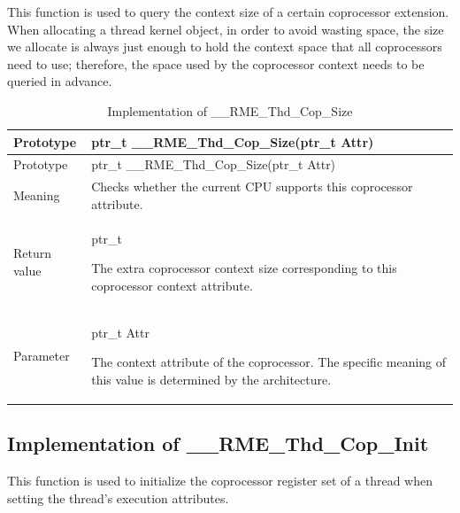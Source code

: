 This function is used to query the context size of a certain coprocessor extension. When allocating a thread kernel object, in order to avoid wasting space, the size we allocate is always just enough to hold the context space that all coprocessors need to use; therefore, the space used by the coprocessor context needs to be queried in advance.

\begin{xltabular}{\textwidth}{@{}>{\hsize\raggedright\arraybackslash}X>{\hsize\raggedright\arraybackslash}X@{}}
\caption{Implementation of \_\_RME\_Thd\_Cop\_Size}\label{tab:7-70-rme-thd-cop-size-implementation}\\
\toprule
Prototype & ptr\_t \_\_RME\_Thd\_Cop\_Size(ptr\_t Attr)\tabularnewline
\endfirsthead
\toprule
Prototype & ptr\_t \_\_RME\_Thd\_Cop\_Size(ptr\_t Attr)\tabularnewline
\midrule
\endhead
\bottomrule
\endlastfoot
Meaning & Checks whether the current CPU supports this coprocessor attribute.\tabularnewline
Return value\strut
 & ptr\_t

The extra coprocessor context size corresponding to this coprocessor context attribute.\strut
\tabularnewline
Parameter\strut
 & ptr\_t Attr

The context attribute of the coprocessor. The specific meaning of this value is determined by the architecture.\strut
\tabularnewline
\end{xltabular}
\nopagebreak[4]

\subsection{Implementation of \_\_RME\_Thd\_Cop\_Init}\label{subsec:7-rme-thd-cop-init-implementation}

This function is used to initialize the coprocessor register set of a thread when setting the thread's execution attributes.

